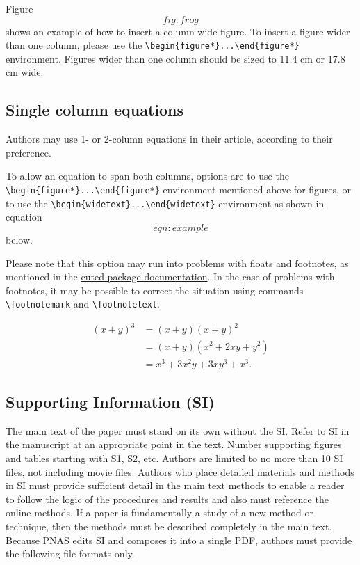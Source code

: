 \documentclass[9pt,twocolumn,twoside,]{pnas-new}
\begin{document}
Figure \[fig:frog\] shows an example of how to insert a column-wide
figure. To insert a figure wider than one column, please use the
\texttt{\textbackslash{}begin\{figure*\}...\textbackslash{}end\{figure*\}}
environment. Figures wider than one column should be sized to 11.4 cm or
17.8 cm wide.

\hypertarget{single-column-equations}{%
\subsection*{Single column equations}\label{single-column-equations}}

Authors may use 1- or 2-column equations in their article, according to
their preference.

To allow an equation to span both columns, options are to use the
\texttt{\textbackslash{}begin\{figure*\}...\textbackslash{}end\{figure*\}}
environment mentioned above for figures, or to use the
\texttt{\textbackslash{}begin\{widetext\}...\textbackslash{}end\{widetext\}}
environment as shown in equation \[eqn:example\] below.

Please note that this option may run into problems with floats and
footnotes, as mentioned in the \href{http://texdoc.net/pkg/cuted}{cuted
package documentation}. In the case of problems with footnotes, it may
be possible to correct the situation using commands
\texttt{\textbackslash{}footnotemark} and
\texttt{\textbackslash{}footnotetext}.

\[\begin{aligned}
(x+y)^3&=(x+y)(x+y)^2\\
       &=(x+y)(x^2+2xy+y^2) \label{eqn:example} \\
       &=x^3+3x^2y+3xy^3+x^3. 
\end{aligned}\]

\hypertarget{supporting-information-si}{%
\subsection*{Supporting Information
(SI)}\label{supporting-information-si}}

The main text of the paper must stand on its own without the SI. Refer
to SI in the manuscript at an appropriate point in the text. Number
supporting figures and tables starting with S1, S2, etc. Authors are
limited to no more than 10 SI files, not including movie files. Authors
who place detailed materials and methods in SI must provide sufficient
detail in the main text methods to enable a reader to follow the logic
of the procedures and results and also must reference the online
methods. If a paper is fundamentally a study of a new method or
technique, then the methods must be described completely in the main
text. Because PNAS edits SI and composes it into a single PDF, authors
must provide the following file formats only.
\end{document}
